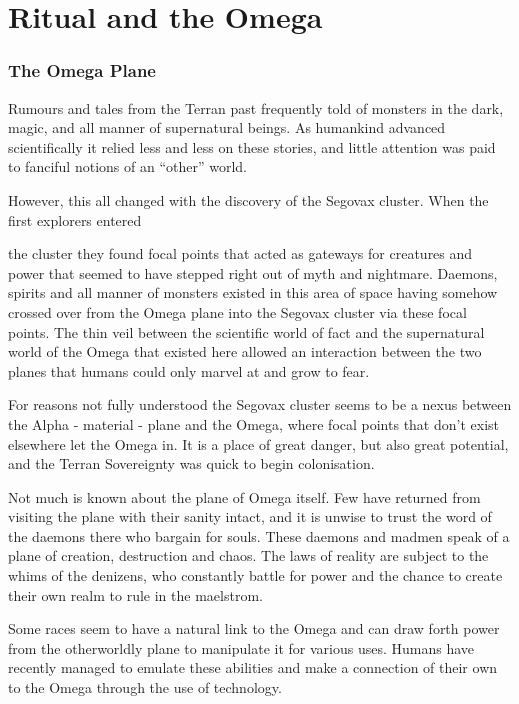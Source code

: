 \chapter{Ritual and the Omega}

\subsection{The Omega Plane}

Rumours and tales from the Terran past frequently told of monsters in the dark, magic, and all manner of supernatural beings. As humankind advanced scientifically it relied less and less on these stories, and little attention was paid to fanciful notions of an ``other'' world.

However, this all changed with the discovery of the Segovax cluster. When the first explorers entered

the cluster they found focal points that acted as gateways for creatures and power that seemed to have stepped right out of myth and nightmare. Daemons, spirits and all manner of monsters existed in this area of space having somehow crossed over from the Omega plane into the Segovax cluster via these focal points. The thin veil between the scientific world of fact and the supernatural world of the Omega that existed here allowed an interaction between the two planes that humans could only marvel at and grow to fear.

For reasons not fully understood the Segovax cluster seems to be a nexus between the Alpha - material - plane and the Omega, where focal points that don't exist elsewhere let the Omega in. It is a place of great danger, but also great potential, and the Terran Sovereignty was quick to begin colonisation.

Not much is known about the plane of Omega itself. Few have returned from visiting the plane with their sanity intact, and it is unwise to trust the word of the daemons there who bargain for souls. These daemons and madmen speak of a plane of creation, destruction and chaos. The laws of reality are subject to the whims of the denizens, who constantly battle for power and the chance to create their own realm to rule in the maelstrom.

Some races seem to have a natural link to the Omega and can draw forth power from the otherworldly plane to manipulate it for various uses. Humans have recently managed to emulate these abilities and make a connection of their own to the Omega through the use of technology.

